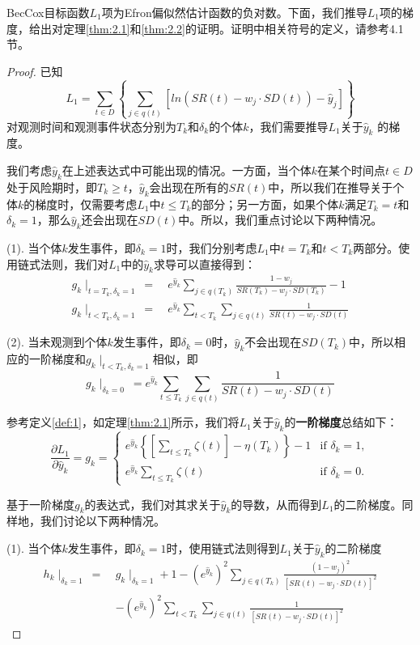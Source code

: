 BecCox目标函数$L_1$项为Efron偏似然估计函数的负对数。下面，我们推导$L_1$项的梯度，给出对定理\ref{thm:2.1}和\ref{thm:2.2}的证明。证明中相关符号的定义，请参考4.1节。
\begin{proof}
已知$$L_1 = \sum_{t\in D} \left\{ \sum_{j\in q(t)} [ln(SR(t)-w_j\cdot SD(t))-\hat{y}_j] \right\}$$ 对观测时间和观测事件状态分别为$T_k$和$\delta_k$的个体$k$，我们需要推导$L_1$关于$\hat{y}_k$ 的梯度。

我们考虑$\hat{y}_k$在上述表达式中可能出现的情况。一方面，当个体$k$在某个时间点$t\in D$处于风险期时，即$T_k\ge t$，$\hat{y}_k$会出现在所有的$SR(t)$中，所以我们在推导关于个体$k$的梯度时，仅需要考虑$L_1$中$t \le T_k$的部分；另一方面，如果个体$k$满足$T_k=t$和$\delta_k=1$，那么$\hat{y}_k$还会出现在$SD(t)$中。所以，我们重点讨论以下两种情况。

(1). 当个体$k$发生事件，即$\delta_k=1$时，我们分别考虑$L_1$中$t=T_k$和$t<T_k$两部分。使用链式法则，我们对$L_1$中的$\hat{y}_k$求导可以直接得到：\[
\begin{split}
g_k\mid_{t=T_k,\delta_k=1} \ =\ & e^{\hat{y}_k}\sum_{j\in q(T_k)} \frac{1-w_j}{SR(T_k) - w_j\cdot SD(T_k)} - 1 \\
g_k\mid_{t<T_k,\delta_k=1} \ =\ & e^{\hat{y}_k}\sum_{t<T_k} \sum_{j\in q(t)} \frac{1}{SR(t) - w_j\cdot SD(t)}
\end{split}
\]

(2). 当未观测到个体$k$发生事件，即$\delta_k=0$时，$\hat{y}_k$不会出现在$SD(T_k)$中，所以相应的一阶梯度和$g_k\mid_{t<T_k,\delta_k=1}$相似，即$$
g_k\mid_{\delta_k=0} \ = e^{\hat{y}_k}\sum_{t\le T_k} \sum_{j\in q(t)} \frac{1}{SR(t) - w_j\cdot SD(t)}
$$

参考定义\ref{def:1}，如定理\ref{thm:2.1}所示，我们将$L_1$关于$\hat{y}_k$的\textbf{一阶梯度}总结如下：$$
\frac{\partial L_1}{\partial \hat{y}_k} = g_k = 
\begin{cases}
e^{\hat{y}_k} \left\{ \left[\sum_{t\le T_k} \zeta(t)\right] - \eta(T_k) \right\} - 1 & \text{if } \delta_k = 1,\\
e^{\hat{y}_k} \sum_{t\le T_k} \zeta(t) & \text{if } \delta_k = 0.
\end{cases}
$$

基于一阶梯度$g_k$的表达式，我们对其求关于$\hat{y}_k$的导数，从而得到$L_1$的二阶梯度。同样地，我们讨论以下两种情况。

(1). 当个体$k$发生事件，即$\delta_k=1$时，使用链式法则得到$L_1$关于$\hat{y}_k$的二阶梯度\[
\begin{split}
h_k\mid_{\delta_k=1}\ =\ & g_k\mid_{\delta_k=1} + 1 - (e^{\hat{y}_k})^2 \sum_{j\in q(T_k)} \frac{(1-w_j)^2}{[SR(t) - w_j\cdot SD(t)]^2} \\
   & -(e^{\hat{y}_k})^2 \sum_{t< T_k} \sum_{j\in q(t)} \frac{1}{[SR(t) - w_j\cdot SD(t)]^2}
\end{split}
\]


\end{proof}
